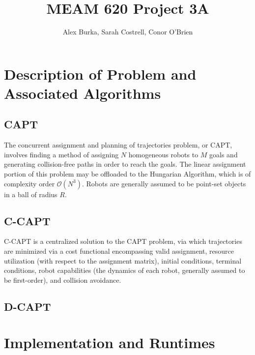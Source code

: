 \documentclass[11pt]{article}
\begin{document}
\author{Alex Burka, Sarah Costrell, Conor O'Brien}
\title{MEAM 620 Project 3A}
\maketitle

\section{Description of Problem and Associated Algorithms}

\subsection{CAPT}
The concurrent assignment and planning of trajectories problem, or CAPT, involves finding a method of assigning $N$ homogeneous robots to $M$ goals and generating collision-free paths in order to reach the goals. The linear assignment portion of this problem may be offloaded to the Hungarian Algorithm, which is of complexity order $\mathcal{O}(N^3)$. Robots are generally assumed to be point-set objects in a ball of radius $R$.

\subsection{C-CAPT}
C-CAPT is a centralized solution to the CAPT problem, via which trajectories are minimized via a cost functional encompassing valid assignment, resource utilization (with respect to the assignment matrix), initial conditions, terminal conditions, robot capabilities (the dynamics of each robot, generally assumed to be first-order), and collision avoidance. \\


\subsection{D-CAPT}

\section{Implementation and Runtimes}
\end{document}
